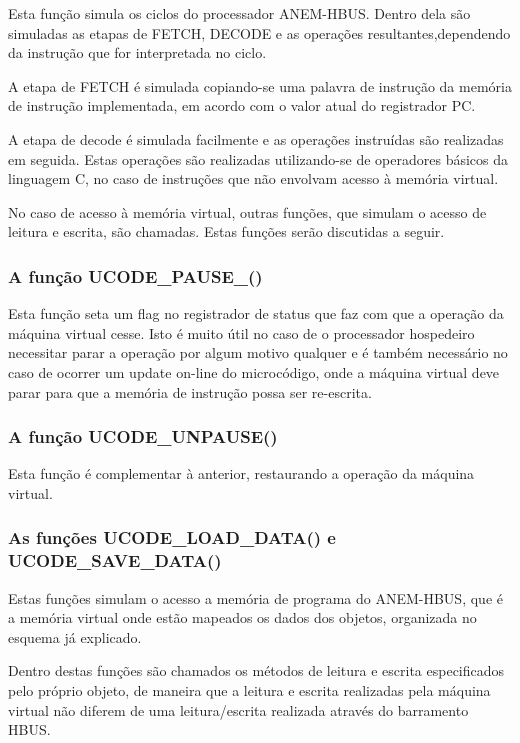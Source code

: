 Esta função simula os ciclos do processador ANEM-HBUS. Dentro dela são simuladas as etapas de FETCH, DECODE e as operações resultantes,dependendo da instrução que for interpretada no ciclo.

A etapa de FETCH é simulada copiando-se uma palavra de instrução da memória de instrução implementada, em acordo com o valor atual do registrador PC.

A etapa de decode é simulada facilmente e as operações instruídas são realizadas em seguida. Estas operações são realizadas utilizando-se de operadores básicos da linguagem C, no caso de instruções que não envolvam acesso à memória virtual.

No caso de acesso à memória virtual, outras funções, que simulam o acesso de leitura e escrita, são chamadas. Estas funções serão discutidas a seguir.

\subsubsection{A função UCODE\_PAUSE\_()}

Esta função seta um flag no registrador de status que faz com que a operação da máquina virtual cesse. Isto é muito útil no caso de o processador hospedeiro necessitar parar a operação por algum motivo qualquer e é também necessário no caso de ocorrer um update on-line do microcódigo, onde a máquina virtual deve parar para que a memória de instrução possa ser re-escrita.

\subsubsection{A função UCODE\_UNPAUSE()}

Esta função é complementar à anterior, restaurando a operação da máquina virtual.

\subsubsection{As funções UCODE\_LOAD\_DATA() e UCODE\_SAVE\_DATA()}

Estas funções simulam o acesso a memória de programa do ANEM-HBUS, que é a memória virtual onde estão mapeados os dados dos objetos, organizada no esquema já explicado.

Dentro destas funções são chamados os métodos de leitura e escrita especificados pelo próprio objeto, de maneira que a leitura e escrita realizadas pela máquina virtual não diferem de uma leitura/escrita realizada através do barramento HBUS.


